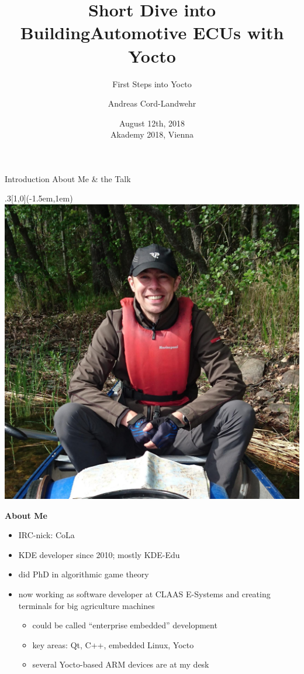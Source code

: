 \documentclass[ucs,9pt]{beamer}
\title[Automotive ECUs with Yocto]{Short Dive into Building\newline Automotive ECUs with Yocto}
\subtitle{First Steps into Yocto}
\author{Andreas Cord-Landwehr}
\date{\textnormal{August 12th, 2018\\[\medskipamount] Akademy 2018, Vienna}}
\begin{document}
\maketitle

\begin{frame}
    {Introduction}
    {About Me \& the Talk}

    \begin{textblock*}{.3\paperwidth}[1,0](\paperwidth-1.5em,1em)%
        \includegraphics[width=\linewidth]{images/me}
    \end{textblock*}%

    \textbf{About Me}
    \begin{itemize}
        \item IRC-nick: CoLa
        \item KDE developer since 2010; mostly KDE-Edu
        \item did PhD in algorithmic game theory
        \item now working as software developer at\newline
            CLAAS E-Systems and creating terminals for big agriculture machines
        \begin{itemize}
            \item could be called ``enterprise embedded'' development
            \item key areas: Qt, C++, embedded Linux, Yocto
            \item several Yocto-based ARM devices are at my desk
        \end{itemize}
    \end{itemize}
    \bigskip


\end{frame}
\end{document}
